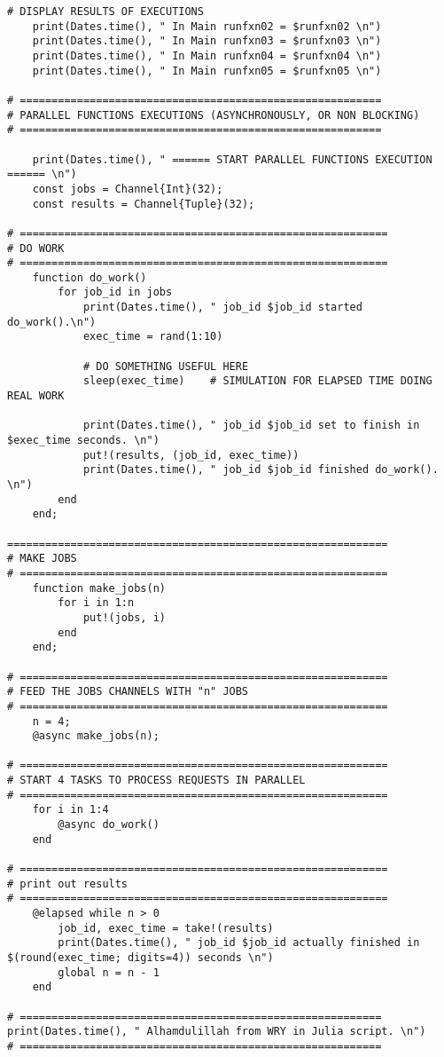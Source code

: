 \begin{lstlisting}[caption={App4-Julia Parallel Programming Codes}, label=App4-Julia Parallel Programming Codes]
# DISPLAY RESULTS OF EXECUTIONS
	print(Dates.time(), " In Main runfxn02 = $runfxn02 \n")
	print(Dates.time(), " In Main runfxn03 = $runfxn03 \n")
	print(Dates.time(), " In Main runfxn04 = $runfxn04 \n")
	print(Dates.time(), " In Main runfxn05 = $runfxn05 \n")

# =========================================================
# PARALLEL FUNCTIONS EXECUTIONS (ASYNCHRONOUSLY, OR NON BLOCKING)
# =========================================================

	print(Dates.time(), " ====== START PARALLEL FUNCTIONS EXECUTION ====== \n")
	const jobs = Channel{Int}(32);
	const results = Channel{Tuple}(32);

# ==========================================================
# DO WORK
# ==========================================================
	function do_work()
		for job_id in jobs
			print(Dates.time(), " job_id $job_id started do_work().\n")
			exec_time = rand(1:10)
			
			# DO SOMETHING USEFUL HERE
			sleep(exec_time)    # SIMULATION FOR ELAPSED TIME DOING REAL WORK
			
			print(Dates.time(), " job_id $job_id set to finish in $exec_time seconds. \n")
			put!(results, (job_id, exec_time))
			print(Dates.time(), " job_id $job_id finished do_work(). \n")
		end
	end;

============================================================
# MAKE JOBS
# ==========================================================
	function make_jobs(n)
		for i in 1:n
			put!(jobs, i)
		end
	end;

# ==========================================================
# FEED THE JOBS CHANNELS WITH "n" JOBS
# ==========================================================
	n = 4;
	@async make_jobs(n); 

# ==========================================================
# START 4 TASKS TO PROCESS REQUESTS IN PARALLEL
# ==========================================================
	for i in 1:4 
		@async do_work()
	end

# ==========================================================
# print out results
# ==========================================================
	@elapsed while n > 0 
		job_id, exec_time = take!(results)
		print(Dates.time(), " job_id $job_id actually finished in $(round(exec_time; digits=4)) seconds \n")
		global n = n - 1
	end

# =========================================================
print(Dates.time(), " Alhamdulillah from WRY in Julia script. \n")
# =========================================================


\end{lstlisting}
